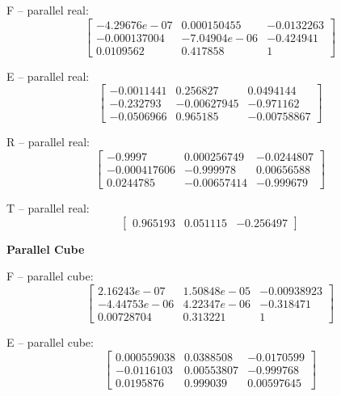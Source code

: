 \documentclass[10pt,a4paper]{article}
\begin{document}
F -- parallel real: 
\begin{equation*}
\begin{bmatrix}
-4.29676e-07 & 0.000150455 & -0.0132263 \\ -0.000137004 & -7.04904e-06 & -0.424941 \\ 0.0109562 & 0.417858 & 1
\end{bmatrix}
\end{equation*}

E -- parallel real: 
\begin{equation*}
\begin{bmatrix}
-0.0011441 & 0.256827 & 0.0494144 \\ -0.232793 & -0.00627945 & -0.971162 \\ -0.0506966 & 0.965185 & -0.00758867
\end{bmatrix}
\end{equation*}

R -- parallel real: 
\begin{equation*}
\begin{bmatrix}
-0.9997 & 0.000256749 & -0.0244807 \\ -0.000417606 & -0.999978 & 0.00656588 \\ 0.0244785 & -0.00657414 & -0.999679
\end{bmatrix}
\end{equation*}

T -- parallel real: 
\begin{equation*}
\begin{bmatrix}
0.965193 & 0.051115 & -0.256497
\end{bmatrix}
\end{equation*}

\textbf{Parallel Cube}

F -- parallel cube: 
\begin{equation*}
\begin{bmatrix}
2.16243e-07 & 1.50848e-05 & -0.00938923 \\ -4.44753e-06 & 4.22347e-06 & -0.318471 \\ 0.00728704 & 0.313221 & 1
\end{bmatrix}
\end{equation*}

E -- parallel cube: 
\begin{equation*}
\begin{bmatrix}
0.000559038 & 0.0388508 & -0.0170599 \\ -0.0116103 & 0.00553807 & -0.999768 \\ 0.0195876 & 0.999039 & 0.00597645
\end{bmatrix}
\end{equation*}
\end{document}
